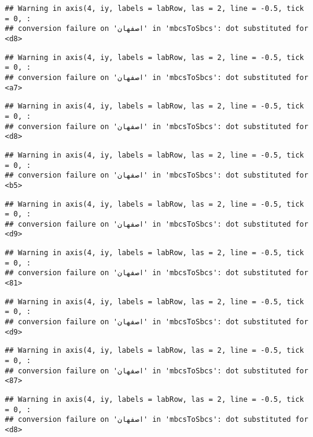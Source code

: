 \documentclass[
]{article}
\begin{document}
\begin{verbatim}
## Warning in axis(4, iy, labels = labRow, las = 2, line = -0.5, tick = 0, :
## conversion failure on 'اصفهان' in 'mbcsToSbcs': dot substituted for <d8>
\end{verbatim}

\begin{verbatim}
## Warning in axis(4, iy, labels = labRow, las = 2, line = -0.5, tick = 0, :
## conversion failure on 'اصفهان' in 'mbcsToSbcs': dot substituted for <a7>
\end{verbatim}

\begin{verbatim}
## Warning in axis(4, iy, labels = labRow, las = 2, line = -0.5, tick = 0, :
## conversion failure on 'اصفهان' in 'mbcsToSbcs': dot substituted for <d8>
\end{verbatim}

\begin{verbatim}
## Warning in axis(4, iy, labels = labRow, las = 2, line = -0.5, tick = 0, :
## conversion failure on 'اصفهان' in 'mbcsToSbcs': dot substituted for <b5>
\end{verbatim}

\begin{verbatim}
## Warning in axis(4, iy, labels = labRow, las = 2, line = -0.5, tick = 0, :
## conversion failure on 'اصفهان' in 'mbcsToSbcs': dot substituted for <d9>
\end{verbatim}

\begin{verbatim}
## Warning in axis(4, iy, labels = labRow, las = 2, line = -0.5, tick = 0, :
## conversion failure on 'اصفهان' in 'mbcsToSbcs': dot substituted for <81>
\end{verbatim}

\begin{verbatim}
## Warning in axis(4, iy, labels = labRow, las = 2, line = -0.5, tick = 0, :
## conversion failure on 'اصفهان' in 'mbcsToSbcs': dot substituted for <d9>
\end{verbatim}

\begin{verbatim}
## Warning in axis(4, iy, labels = labRow, las = 2, line = -0.5, tick = 0, :
## conversion failure on 'اصفهان' in 'mbcsToSbcs': dot substituted for <87>
\end{verbatim}

\begin{verbatim}
## Warning in axis(4, iy, labels = labRow, las = 2, line = -0.5, tick = 0, :
## conversion failure on 'اصفهان' in 'mbcsToSbcs': dot substituted for <d8>
\end{verbatim}
\end{document}
